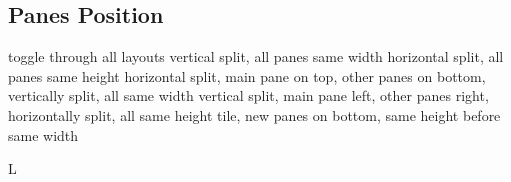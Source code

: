 \subsection{Panes Position}{}
	{toggle through all layouts}
	{vertical split, all panes same width}
	{horizontal split, all panes same height}
	{horizontal split, main pane on top, other panes on bottom, vertically split, all same width}
	{vertical split, main pane left, other panes right, horizontally split, all same height}
	{tile, new panes on bottom, same height before same width}

\copyrightnotice

\supereject
\if L\lr \else\null\vfill\eject\fi
\bye

